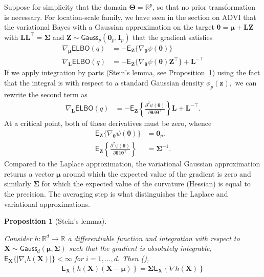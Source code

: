 \documentclass[
  11pt,
  letterpaper,
]{scrbook}
\theoremstyle{plain}
\newtheorem{proposition}{Proposition}[chapter]
\theoremstyle{definition}
\theoremstyle{definition}
\theoremstyle{plain}
\theoremstyle{plain}
\theoremstyle{definition}
\theoremstyle{remark}
\begin{document}
Suppose for simplicity that the domain
\(\boldsymbol{\Theta}=\mathbb{R}^p\), so that no prior transformation is
necessary. For location-scale family, we have seen in the section on
ADVI that the variational Bayes with a Gaussian approximation on the
target
\(\boldsymbol{\theta} = \boldsymbol{\mu} + \mathbf{L}\boldsymbol{Z}\)
with \(\mathbf{LL}^\top=\boldsymbol{\Sigma}\) and
\(\boldsymbol{Z} \sim \mathsf{Gauss}_p(\boldsymbol{0}_p, \mathbf{I}_p)\)
that the gradient satisfies \begin{align*}
 \nabla_{\boldsymbol{\mu}}\mathsf{ELBO}(q)&= -\mathsf{E}_{\boldsymbol{Z}}\{\nabla_{\boldsymbol{\theta}}\psi(\boldsymbol{\theta})\} \\
 \nabla_{\mathbf{L}}\mathsf{ELBO}(q)&= -\mathsf{E}_{\boldsymbol{Z}}\{\nabla_{\boldsymbol{\theta}}\psi(\boldsymbol{\theta})\boldsymbol{Z}^\top\} + \mathbf{L}^{-\top}
\end{align*} If we apply integration by parts (Stein's lemma, see
Proposition~\ref{prp-stein}) using the fact that the integral is with
respect to a standard Gaussian density \(\phi_p(\boldsymbol{z}),\) we
can rewrite the second term as \begin{align*}
  \nabla_{\mathbf{L}}\mathsf{ELBO}(q)&= -\mathsf{E}_{\boldsymbol{Z}}\left\{ \frac{\partial^2 \psi(\boldsymbol{\theta})}{\partial \boldsymbol{\theta} \partial \boldsymbol{\theta}^\top}\right\}\mathbf{L} + \mathbf{L}^{-\top}.
\end{align*} At a critical point, both of these derivatives must be
zero, whence \begin{align*}
 \mathsf{E}_{\boldsymbol{Z}}\{\nabla_{\boldsymbol{\theta}}\psi(\boldsymbol{\theta})\} &= \boldsymbol{0}_p. \\
 \mathsf{E}_{\boldsymbol{Z}}\left\{ \frac{\partial^2 \psi(\boldsymbol{\theta})}{\partial \boldsymbol{\theta} \partial \boldsymbol{\theta}^\top}\right\} &= \boldsymbol{\Sigma}^{-1}.
\end{align*} Compared to the Laplace approximation, the variational
Gaussian approximation returns a vector \(\boldsymbol{\mu}\) around
which the expected value of the gradient is zero and similarly
\(\boldsymbol{\Sigma}\) for which the expected value of the curvature
(Hessian) is equal to the precision. The averaging step is what
distinguishes the Laplace and variational approximations.

\begin{proposition}[Stein's
lemma]\protect\hypertarget{prp-stein}{}\label{prp-stein}

Consider \(h: \mathbb{R}^d \to \mathbb{R}\) a differentiable function
and integration with respect to
\(\boldsymbol{X} \sim \mathsf{Gauss}_d(\boldsymbol{\mu}, \boldsymbol{\Sigma})\)
such that the gradient is absolutely integrable,
\(\mathsf{E}_{\boldsymbol{X}}\{|\nabla_i h(\boldsymbol{X})|\} < \infty\)
for \(i=1, \ldots, d.\) Then (),
\begin{align*}
\mathsf{E}_{\boldsymbol{X}}\left\{h(\boldsymbol{X})(\boldsymbol{X}-\boldsymbol{\mu})\right\} = \boldsymbol{\Sigma}\mathsf{E}_{\boldsymbol{X}}\left\{\nabla h(\boldsymbol{X})\right\}
\end{align*}

\end{proposition}
\end{document}
